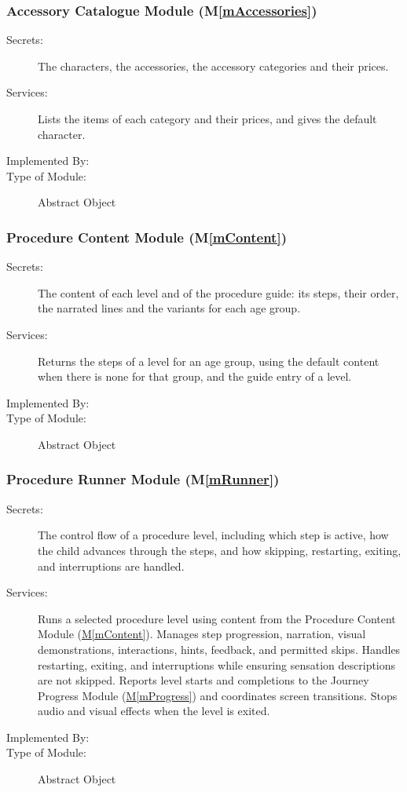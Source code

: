 \documentclass[10pt, titlepage]{article}
\newcommand{\mref}[1]{\texorpdfstring{\hyperref[md:#1]{M\ref*{#1}}}{M\ref*{#1}}}
\newcommand{\mplainref}[1]{M\ref*{#1}}
\begin{document}
\subsubsection{Accessory Catalogue Module (\mplainref{mAccessories})}\label{md:mAccessories}

\begin{description}
\item[Secrets:] The characters, the accessories, the accessory categories and
  their prices.
\item[Services:] Lists the items of each category and their prices, and gives
  the default character.
\item[Implemented By:] \progname{}
\item[Type of Module:] Abstract Object
\end{description}

\subsubsection{Procedure Content Module (\mplainref{mContent})}\label{md:mContent}

\begin{description}
\item[Secrets:] The content of each level and of the procedure guide: its
  steps, their order, the narrated lines and the variants for each age group.
\item[Services:] Returns the steps of a level for an age group, using the
  default content when there is none for that group, and the guide entry of a
  level.
\item[Implemented By:] \progname{}
\item[Type of Module:] Abstract Object
\end{description}

\subsubsection{Procedure Runner Module (\mplainref{mRunner})}\label{md:mRunner}

\begin{description}
\item[Secrets:] The control flow of a procedure level, including which step
  is active, how the child advances through the steps, and how skipping,
  restarting, exiting, and interruptions are handled.
\item[Services:] Runs a selected procedure level using content from the
  Procedure Content Module (\mref{mContent}). Manages step progression, narration, visual
  demonstrations, interactions, hints, feedback, and permitted skips.
  Handles restarting, exiting, and interruptions while ensuring sensation
  descriptions are not skipped. Reports level starts and completions to
  the Journey Progress Module (\mref{mProgress}) and coordinates screen transitions.
  Stops audio and visual effects when the level is exited.
\item[Implemented By:] \progname{}
\item[Type of Module:] Abstract Object
\end{description}
\end{document}

